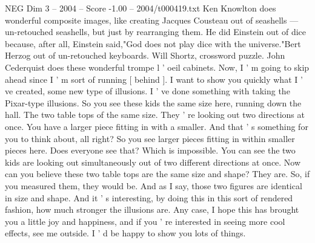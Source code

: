 \begin{textsample}{NEG Dim 3 – 2004 – Score -1.00 – 2004/t000419.txt}
Ken Knowlton does wonderful composite images, like creating Jacques Cousteau out of seashells — un-retouched seashells, but just by rearranging them.
He did Einstein out of dice because, after all, Einstein said,"God does not play dice with the universe."Bert Herzog out of un-retouched keyboards.
Will Shortz, crossword puzzle.
John Cederquist does these wonderful trompe l ' oeil cabinets.
Now, I ' m going to skip ahead since I ' m sort of running [ behind ].
I want to show you quickly what I ' ve created, some new type of illusions.
I ' ve done something with taking the Pixar-type illusions.
So you see these kids the same size here, running down the hall.
The two table tops of the same size.
They ' re looking out two directions at once.
You have a larger piece fitting in with a smaller.
And that ' s something for you to think about, all right?
So you see larger pieces fitting in within smaller pieces here.
Does everyone see that?
Which is impossible.
You can see the two kids are looking out simultaneously out of two different directions at once.
Now can you believe these two table tops are the same size and shape?
They are.
So, if you measured them, they would be.
And as I say, those two figures are identical in size and shape.
And it ' s interesting, by doing this in this sort of rendered fashion, how much stronger the illusions are.
Any case, I hope this has brought you a little joy and happiness, and if you ' re interested in seeing more cool effects, see me outside.
I ' d be happy to show you lots of things.

\end{textsample}
